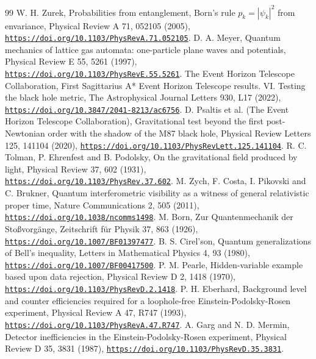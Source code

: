 \documentclass[pdflatex,sn-mathphys-num]{sn-jnl}
\theoremstyle{thmstyleone}
\begin{document}
\begin{thebibliography}{99}
 W. H. Zurek, Probabilities from entanglement, Born's rule $p_k = |\psi_k|^2$ from envariance, Physical Review A 71, 052105 (2005), \href{https://doi.org/10.1103/PhysRevA.71.052105}{\nolinkurl{https://doi.org/10.1103/PhysRevA.71.052105}}.
 D. A. Meyer, Quantum mechanics of lattice gas automata: one-particle plane waves and potentials, Physical Review E 55, 5261 (1997), \href{https://doi.org/10.1103/PhysRevE.55.5261}{\nolinkurl{https://doi.org/10.1103/PhysRevE.55.5261}}.
 The Event Horizon Telescope Collaboration, First Sagittarius A* Event Horizon Telescope results. VI. Testing the black hole metric, The Astrophysical Journal Letters 930, L17 (2022), \href{https://doi.org/10.3847/2041-8213/ac6756}{\nolinkurl{https://doi.org/10.3847/2041-8213/ac6756}}.
 D. Psaltis et al. (The Event Horizon Telescope Collaboration), Gravitational test beyond the first post-Newtonian order with the shadow of the M87 black hole, Physical Review Letters 125, 141104 (2020), \href{https://doi.org/10.1103/PhysRevLett.125.141104}{\nolinkurl{https://doi.org/10.1103/PhysRevLett.125.141104}}.
 R. C. Tolman, P. Ehrenfest and B. Podolsky, On the gravitational field produced by light, Physical Review 37, 602 (1931), \href{https://doi.org/10.1103/PhysRev.37.602}{\nolinkurl{https://doi.org/10.1103/PhysRev.37.602}}.
 M. Zych, F. Costa, I. Pikovski and C. Brukner, Quantum interferometric visibility as a witness of general relativistic proper time, Nature Communications 2, 505 (2011), \href{https://doi.org/10.1038/ncomms1498}{\nolinkurl{https://doi.org/10.1038/ncomms1498}}.
 M. Born, Zur Quantenmechanik der Sto\ss{}vorg\"ange, Zeitschrift f\"ur Physik 37, 863 (1926), \href{https://doi.org/10.1007/BF01397477}{\nolinkurl{https://doi.org/10.1007/BF01397477}}.
 B. S. Cirel'son, Quantum generalizations of Bell's inequality, Letters in Mathematical Physics 4, 93 (1980), \href{https://doi.org/10.1007/BF00417500}{\nolinkurl{https://doi.org/10.1007/BF00417500}}.
 P. M. Pearle, Hidden-variable example based upon data rejection, Physical Review D 2, 1418 (1970), \href{https://doi.org/10.1103/PhysRevD.2.1418}{\nolinkurl{https://doi.org/10.1103/PhysRevD.2.1418}}.
 P. H. Eberhard, Background level and counter efficiencies required for a loophole-free Einstein-Podolsky-Rosen experiment, Physical Review A 47, R747 (1993), \href{https://doi.org/10.1103/PhysRevA.47.R747}{\nolinkurl{https://doi.org/10.1103/PhysRevA.47.R747}}.
 A. Garg and N. D. Mermin, Detector inefficiencies in the Einstein-Podolsky-Rosen experiment, Physical Review D 35, 3831 (1987), \href{https://doi.org/10.1103/PhysRevD.35.3831}{\nolinkurl{https://doi.org/10.1103/PhysRevD.35.3831}}.

\end{thebibliography}
\end{document}

